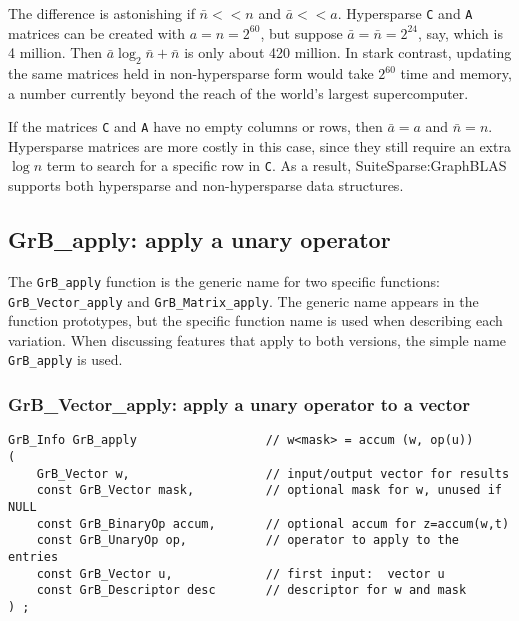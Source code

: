 \documentclass[12pt]{article}
\begin{document}
The difference is astonishing if $\bar{n} << n$ and $\bar{a} << a$.
Hypersparse \verb'C' and \verb'A' matrices can be created with $a = n =
2^{60}$, but suppose $\bar{a} = \bar{n} = 2^{24}$, say, which is 4 million.
Then $\bar{a} \log_{2} \bar{n} + \bar{n}$ is only about 420 million.  In stark
contrast, updating the same matrices held in non-hypersparse form would take
$2^{60}$ time and memory, a number currently beyond the reach of the world's
largest supercomputer.

If the matrices \verb'C' and \verb'A' have no empty columns or rows, then
$\bar{a} = a$ and $\bar{n}=n$.  Hypersparse matrices are more costly in this
case, since they still require an extra $\log n$ term to search for a specific
row in \verb'C'.  As a result, SuiteSparse:GraphBLAS supports both
hypersparse and non-hypersparse data structures.

\newpage
\subsection{{\sf GrB\_apply:} apply a unary operator} %
\label{apply}

The \verb'GrB_apply' function is the generic name for two specific functions:
\\ \verb'GrB_Vector_apply' and  \verb'GrB_Matrix_apply'.  The generic name
appears in the function prototypes, but the specific function name is used when
describing each variation.  When discussing features that apply to both
versions, the simple name \verb'GrB_apply' is used.

\subsubsection{{\sf GrB\_Vector\_apply:} apply a unary operator to a vector}
\label{apply_vector}

\begin{mdframed}[userdefinedwidth=6in]
{\footnotesize
\begin{verbatim}
GrB_Info GrB_apply                  // w<mask> = accum (w, op(u))
(
    GrB_Vector w,                   // input/output vector for results
    const GrB_Vector mask,          // optional mask for w, unused if NULL
    const GrB_BinaryOp accum,       // optional accum for z=accum(w,t)
    const GrB_UnaryOp op,           // operator to apply to the entries
    const GrB_Vector u,             // first input:  vector u
    const GrB_Descriptor desc       // descriptor for w and mask
) ;
\end{verbatim} } \end{mdframed}
\end{document}
